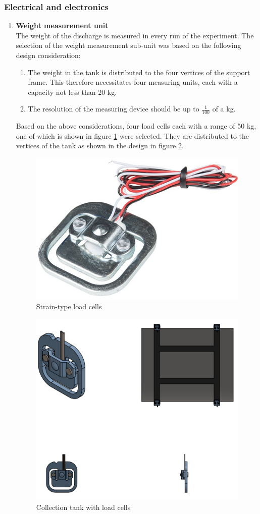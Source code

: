 \subsubsection{Electrical and electronics}
\begin{enumerate}
\item \textbf{Weight measurement unit}\\
The weight of the discharge is measured in every run of the experiment. The selection of the weight measurement sub-unit was based on the following design consideration:
\begin{enumerate}
    \item The weight in the tank is distributed to the four vertices of the support frame. This therefore necessitates four measuring units, each with a capacity not less than 20 kg.
    \item The resolution of the measuring device should be up to $\frac{1}{100}$ of a kg. 
\end{enumerate}
Based on the above considerations, four load cells each with a range of 50 kg, one of which is shown in figure \ref{fig:load_cell_disc} were selected. They are distributed to the vertices of the tank as shown in the  design in figure \ref{fig:collection_tank_with_load_cells}.

\begin{figure}[H]
    \centering
    \includegraphics[width=.25\textwidth, height=.25\textheight]{Figures/50KgLoadCell.jpg}
    \caption[Strain-type load cells]{Strain-type load cells \cite{loadcell}}
    \label{fig:load_cell_disc}
\end{figure}
\begin{figure}[H]
\centering
\includegraphics[height=.45\textheight]{Figures/CollectionTankWithTheLoadCells.jpg}
\caption{Collection tank with load cells}
\label{fig:collection_tank_with_load_cells}
\end{figure}


\end{enumerate}
